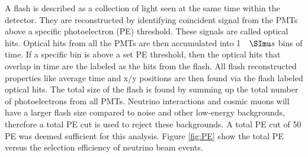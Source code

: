A flash is described as a collection of light seen at the same time within the detector. They are reconstructed by identifying coincident signal from the PMTs above a specific photoelectron (PE) threshold. These signals are called optical hits. Optical hits from all the PMTs are then accumulated into 1 $\micro s$ bins of time. If a specific bin is above a set PE threshold, then the optical hits that overlap in time are the labeled as the hits from the flash. All flash reconstructed properties like average time and x/y positions are then found via the flash labeled optical hits. The total size of the flash is found by summing up the total number of photoelectrons from all PMTs. Neutrino interactions and cosmic muons will have a larger flash size compared to noise and other low-energy backgrounds, therefore a total PE cut is used to reject these backgrounds. A total PE cut of 50 PE was deemed sufficient for this analysis. Figure \ref{fig:PE} show the total PE versus the selection efficiency of neutrino beam events. 


